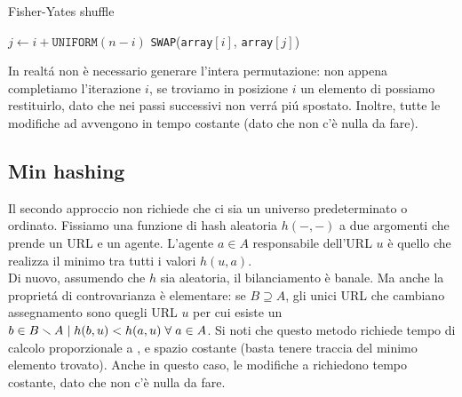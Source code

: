 \begin{algorithm}
\caption{Fisher-Yates shuffle}
\begin{algorithmic}
    \State $j \gets i + \texttt{UNIFORM}(n - i)$
    \State \texttt{SWAP}(\texttt{array}$[i]$, \texttt{array}$[j]$)
    \EndFor
\end{algorithmic}
\end{algorithm}
In realtá non è necessario generare l'intera permutazione: non appena completiamo l'iterazione $i$, se troviamo in posizione $i$ un elemento di  possiamo restituirlo, dato che nei passi successivi non verrá piú spostato. Inoltre, tutte le modifiche ad  avvengono in tempo costante (dato che non c'è nulla da fare).
\subsection{Min hashing}
Il secondo approccio non richiede che ci sia un universo predeterminato o ordinato. Fissiamo una funzione di hash aleatoria $h(-, -)$ a due argomenti che prende un URL e un agente. L'agente $a \in A$ responsabile dell'URL $u$ è quello che realizza il minimo tra tutti i valori $h(u, a)$.\\
Di nuovo, assumendo che $h$ sia aleatoria, il bilanciamento è banale. Ma anche la proprietá di controvarianza è elementare: se $B \supseteq A$, gli unici URL che cambiano assegnamento sono quegli URL $u$ per cui esiste un $b \in B \smallsetminus A \hspace{1mm}|\hspace{1mm} h(b, u) < h(a, u) \hspace{1mm}\forall \hspace{1mm} a \in A$.
Si noti che questo metodo richiede tempo di calcolo proporzionale a , e spazio costante (basta tenere traccia del minimo elemento trovato). Anche in questo caso, le modifiche a  richiedono tempo costante, dato che non c'è nulla da fare.
